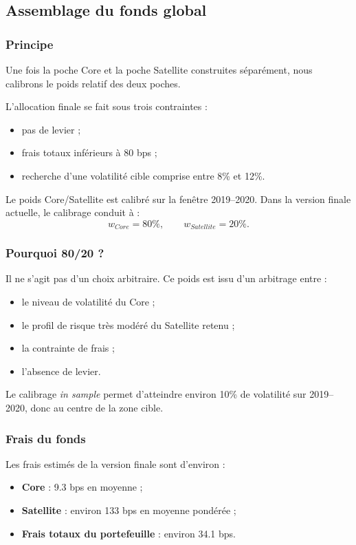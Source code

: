 \documentclass{article}
\begin{document}
\subsection{Assemblage du fonds global}

\subsubsection{Principe}

Une fois la poche Core et la poche Satellite construites séparément, nous calibrons le poids relatif des deux poches.

L’allocation finale se fait sous trois contraintes :
\begin{itemize}
    \item pas de levier ;
    \item frais totaux inférieurs à 80 bps ;
    \item recherche d’une volatilité cible comprise entre 8\% et 12\%.
\end{itemize}

Le poids Core/Satellite est calibré sur la fenêtre 2019--2020. Dans la version finale actuelle, le calibrage conduit à :
\[
w_{Core} = 80\%, \qquad w_{Satellite} = 20\%.
\]

\subsubsection{Pourquoi 80/20 ?}

Il ne s’agit pas d’un choix arbitraire. Ce poids est issu d’un arbitrage entre :
\begin{itemize}
    \item le niveau de volatilité du Core ;
    \item le profil de risque très modéré du Satellite retenu ;
    \item la contrainte de frais ;
    \item l’absence de levier.
\end{itemize}

Le calibrage \textit{in sample} permet d’atteindre environ 10\% de volatilité sur 2019--2020, donc au centre de la zone cible.

\subsubsection{Frais du fonds}

Les frais estimés de la version finale sont d’environ :
\begin{itemize}
    \item \textbf{Core} : 9.3 bps en moyenne ;
    \item \textbf{Satellite} : environ 133 bps en moyenne pondérée ;
    \item \textbf{Frais totaux du portefeuille} : environ 34.1 bps.
\end{itemize}
\end{document}
